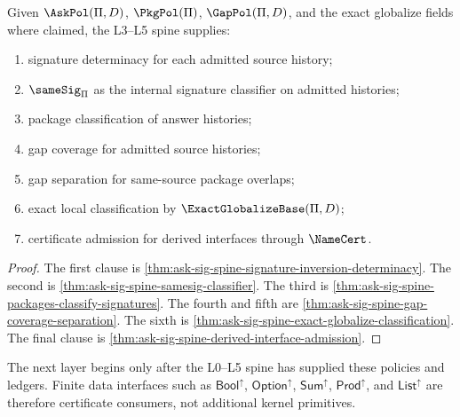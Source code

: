 \begin{theorem}
\label{thm:ask-sig-spine-l3-l5-closure}
Given $\AskPol(\Pi,D)$, $\PkgPol(\Pi)$, $\GapPol(\Pi,D)$, and the exact
globalize fields where claimed, the L3--L5 spine supplies:
\begin{enumerate}
  \item signature determinacy for each admitted source history;
  \item $\sameSig_{\Pi}$ as the internal signature classifier on admitted
  histories;
  \item package classification of answer histories;
  \item gap coverage for admitted source histories;
  \item gap separation for same-source package overlaps;
  \item exact local classification by $\ExactGlobalizeBase(\Pi,D)$;
  \item certificate admission for derived interfaces through $\NameCert$.
\end{enumerate}
\end{theorem}

\begin{proof}
The first clause is \autoref{thm:ask-sig-spine-signature-inversion-determinacy}.
The second is \autoref{thm:ask-sig-spine-samesig-classifier}.  The third is
\autoref{thm:ask-sig-spine-packages-classify-signatures}.  The fourth and
fifth are \autoref{thm:ask-sig-spine-gap-coverage-separation}.  The sixth is
\autoref{thm:ask-sig-spine-exact-globalize-classification}.  The final clause
is \autoref{thm:ask-sig-spine-derived-interface-admission}.
\end{proof}

\begin{principle}
\label{prin:ask-sig-spine-finite-data-boundary}
The next layer begins only after the L0--L5 spine has supplied these
policies and ledgers.  Finite data interfaces such as
$\mathsf{Bool}^{\uparrow}$, $\mathsf{Option}^{\uparrow}$,
$\mathsf{Sum}^{\uparrow}$, $\mathsf{Prod}^{\uparrow}$, and
$\mathsf{List}^{\uparrow}$ are therefore certificate consumers, not
additional kernel primitives.
\end{principle}
